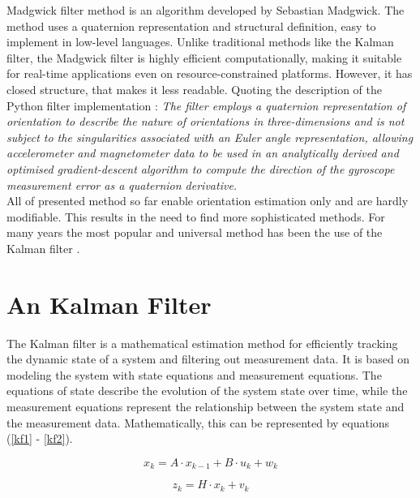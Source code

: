 Madgwick filter method is an algorithm developed by Sebastian Madgwick. The method uses a quaternion representation and structural definition, easy to implement in low-level languages. Unlike traditional methods like the Kalman filter, the Madgwick filter is highly efficient computationally, making it suitable for real-time applications even on resource-constrained platforms. However, it has closed structure, that makes it less readable. Quoting the description of the Python filter implementation \cite{madgwick2}: \textit{The filter employs a quaternion representation of orientation to describe the nature of orientations in three-dimensions and is not subject to the singularities associated with an Euler angle representation, allowing accelerometer and magnetometer data to be used in an analytically derived and optimised gradient-descent algorithm to compute the direction of the gyroscope measurement error as a quaternion derivative.}\\

All of presented method so far enable orientation estimation only and are hardly modifiable. This results in the need to find more sophisticated methods. For many years the most popular and universal method has been the use of the Kalman filter \cite{ekf_poor}.

\section{An Kalman Filter}


The Kalman filter is a mathematical estimation method for efficiently tracking the dynamic state of a system and filtering out measurement data. It is based on modeling the system with state equations and measurement equations. The equations of state describe the evolution of the system state over time, while the measurement equations represent the relationship between the system state and the measurement data. Mathematically, this can be represented by equations (\ref{kf1} - \ref{kf2}).

\begin{equation}
	x_k = A \cdot x_{k-1} + B \cdot u_k + w_k
	\label{kf1}
\end{equation}

\begin{equation}
	z_k = H \cdot x_k + v_k
	\label{kf1}
\end{equation}

